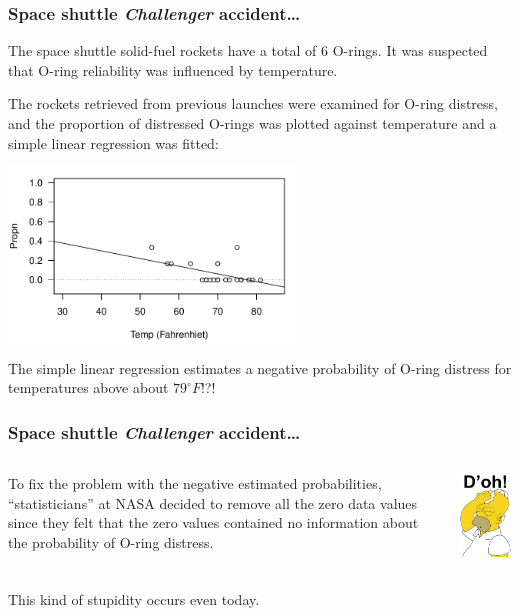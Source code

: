 \documentclass{beamer}\usepackage[]{graphicx}\usepackage[]{xcolor}
\begin{document}
\begin{frame}
\frametitle{Space shuttle {\em Challenger} accident\ldots}
The space shuttle solid-fuel rockets have a total of 6 O-rings.
It was suspected that O-ring reliability was influenced by temperature.

\medskip

The rockets retrieved from previous launches were examined for O-ring distress, 
and the proportion of distressed O-rings was plotted against temperature and
a simple linear regression was fitted:
\begin{center}
\includegraphics[width=3in]{Figures/AllOringsLM}
\end{center}
The simple linear regression estimates a negative probability of O-ring distress for
temperatures above about $79^{\circ}F$!?!
\end{frame}


\begin{frame}
\frametitle{Space shuttle {\em Challenger} accident\ldots}
\begin{columns}
\begin{column}{0.6\textwidth}
{\color{black}To fix the problem with the negative estimated probabilities,
``statisticians'' at NASA decided to remove all the zero data values
since they felt that the zero values
contained no information about the probability of O-ring distress.}
\end{column}
\begin{column}{0.4\textwidth}
\includegraphics[width=1.8in]{Figures/HomerSimpson.jpg}
\end{column}
\end{columns}

This kind of stupidity occurs even today.
\end{frame}
\end{document}
